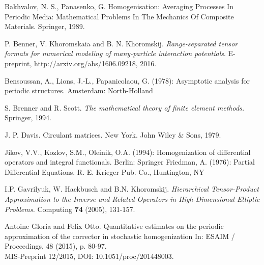 \documentclass[amstex,amstext,amsfonts,epsf,12pt] {amsart}
\begin{document}
\begin{thebibliography}{99}                                                                                              

 Bakhvalov, N. S., Panasenko, G. Homogenisation:
Averaging Processes In Periodic Media: Mathematical Problems In The Mechanics
Of Composite Materials. Springer, 1989.

 P. Benner, V. Khoromskaia and B. N. Khoromskij.
\emph{Range-separated  tensor formats for numerical modeling of many-particle 
interaction potentials}.
E-preprint, http://arxiv.org/abs/1606.09218, 2016.

 Bensoussan, A., Lions, J.-L., Papanicolaou, G. (1978):
Asymptotic analysis for periodic structures. Amsterdam: North-Holland

 S. Brenner  and R. Scott. \emph{The mathematical theory of finite
element methods.} Springer, 1994.

 J. P. Davis. Circulant matrices. New York. John Wiley \& Sons, 1979.


%
%




 Jikov, V.V., Kozlov, S.M., Oleinik, O.A. (1994):
Homogenization of differential operators and integral functionals. Berlin: Springer
Friedman, A. (1976): Partial Differential Equations. R. E.
Krieger Pub. Co., Huntington, NY

I.P. Gavrilyuk, W. Hackbusch and B.N. Khoromskij. {\it  
  Hierarchical Tensor-Product Approximation to the Inverse and
  Related Operators in High-Dimensional Elliptic Problems. }
Computing {\bf 74} (2005), 131-157. 

Antoine Gloria and Felix Otto. 
Quantitative estimates on the periodic approximation of the corrector in stochastic homogenization
In: ESAIM / Proceedings, 48 (2015), p. 80-97.\\
MIS-Preprint  12/2015, DOI: 10.1051/proc/201448003.


\end{thebibliography}
\end{document}

